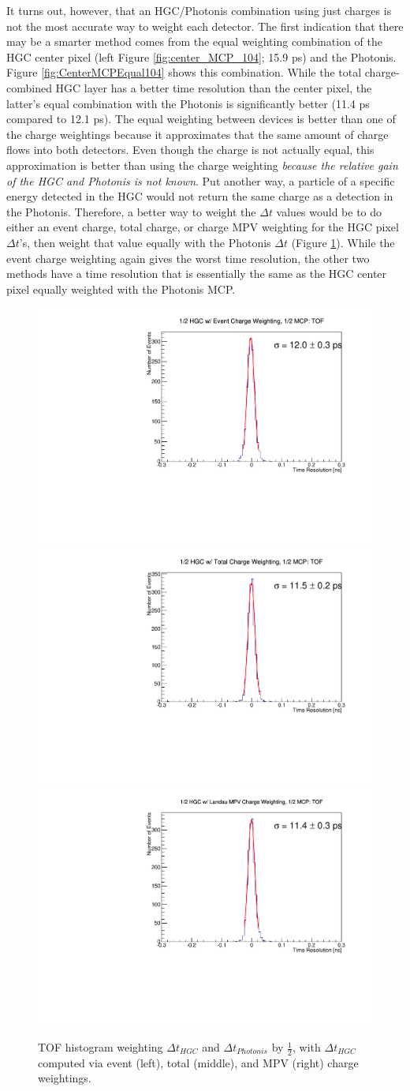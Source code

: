 \documentclass[12pt]{article}
\begin{document}
It turns out, however, that an HGC/Photonis combination using just charges is not the most accurate way to weight each detector. 
The first indication that there may be a smarter method comes from the equal weighting combination of the HGC center pixel (left Figure \ref{fig:center_MCP_104}; 15.9 ps) and the Photonis. 
Figure \ref{fig:CenterMCPEqual104} shows this combination. 
While the total charge-combined HGC layer has a better time resolution than the center pixel, the latter's equal combination with the Photonis is significantly better (11.4 ps compared to 12.1 ps). 
The equal weighting between devices is better than one of the charge weightings because it approximates that the same amount of charge flows into both detectors.
Even though the charge is not actually equal, this approximation is better than using the charge weighting \textit{because the relative gain of the HGC and Photonis is not known}. 
Put another way, a particle of a specific energy detected in the HGC would not return the same charge as a detection in the Photonis. 
Therefore, a better way to weight the $\Delta t$ values would be to do either an event charge, total charge, or charge MPV weighting for the HGC pixel $\Delta t$'s, then weight that value equally with the Photonis $\Delta t$ (Figure \ref{fig:HGCMCP_event_total_MPV_104}). 
While the event charge weighting again gives the worst time resolution, the other two methods have a time resolution that is essentially the same as the HGC center pixel equally weighted with the Photonis MCP. 

\begin{figure}[h]
	\centering
	\includegraphics[width=.32\textwidth]{deltaT_PicoSilEventCharge_MCP_Equal104.pdf}
	\includegraphics[width=.32\textwidth]{deltaT_PicoSilTotalCharge_MCP_Equal104.pdf}
	\includegraphics[width=.32\textwidth]{deltaT_PicoSilLandauCharge_MCP_Equal104.pdf}
	\caption{TOF histogram weighting $\Delta t_{HGC}$ and $\Delta t_{Photonis}$ by $\frac{1}{2}$, with $\Delta t_{HGC}$ computed via event (left), total (middle), and MPV (right) charge weightings.}
	\label{fig:HGCMCP_event_total_MPV_104}
\end{figure}
\end{document}
